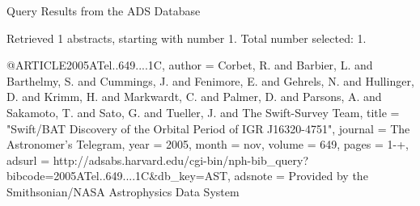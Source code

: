 Query Results from the ADS Database


Retrieved 1 abstracts, starting with number 1.  Total number selected: 1.

@ARTICLE{2005ATel..649....1C,
   author = {{Corbet}, R. and {Barbier}, L. and {Barthelmy}, S. and {Cummings}, J. and 
	{Fenimore}, E. and {Gehrels}, N. and {Hullinger}, D. and {Krimm}, H. and 
	{Markwardt}, C. and {Palmer}, D. and {Parsons}, A. and {Sakamoto}, T. and 
	{Sato}, G. and {Tueller}, J. and {The Swift-Survey Team}},
    title = "{Swift/BAT Discovery of the Orbital Period of IGR J16320-4751}",
  journal = {The Astronomer's Telegram},
     year = 2005,
    month = nov,
   volume = 649,
    pages = {1-+},
   adsurl = {http://adsabs.harvard.edu/cgi-bin/nph-bib_query?bibcode=2005ATel..649....1C&db_key=AST},
  adsnote = {Provided by the Smithsonian/NASA Astrophysics Data System}
}



